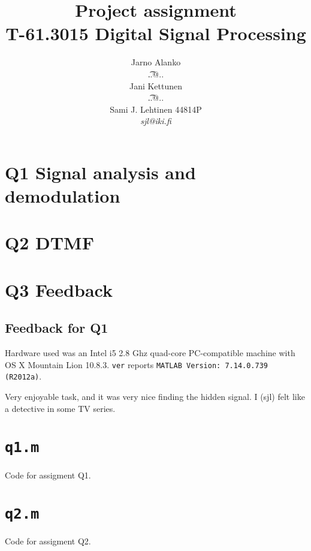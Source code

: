 \documentclass[a4paper]{article}
\begin{document}
\title{Project assignment \\
T-61.3015 Digital Signal Processing}
\author{Jarno Alanko \\
  {\t ..@..} \\
  Jani Kettunen \\
  {\t ..@..} \\
  Sami J. Lehtinen 44814P  \\ 
       {\it sjl@iki.fi}}

\maketitle             
\thispagestyle{empty}
\newpage
{}
\setcounter{page}{2}

\section*{Q1 Signal analysis and demodulation }


\section*{Q2 DTMF}


\section*{Q3 Feedback}
\subsection{Feedback for Q1}
Hardware used was an Intel i5 2.8 Ghz quad-core PC-compatible machine
with OS X Mountain Lion 10.8.3.  {\tt ver} reports 
{\tt MATLAB Version: 7.14.0.739 (R2012a)}.

Very enjoyable task, and it was very nice finding the hidden signal.  I
(sjl) felt like a detective in some TV series.

\clearpage




\newpage
\appendix
\section{{\tt q1.m}}
\label{sect:q1m}
Code for assigment Q1.



\newpage
\section{{\tt q2.m}}
\label{sect:q2m}
Code for assigment Q2.


\end{document}
